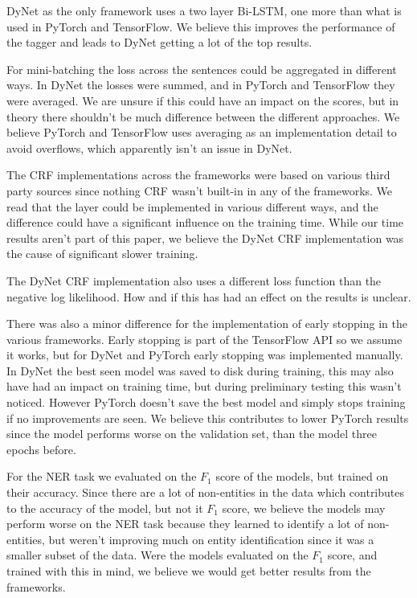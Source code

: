 DyNet as the only framework uses a two layer Bi-LSTM, one more than what is used
in PyTorch and TensorFlow. We believe this improves the performance of the
tagger and leads to DyNet getting a lot of the top results. 

For mini-batching the loss across the sentences could be aggregated in different
ways. In DyNet the losses were summed, and in PyTorch and TensorFlow they were
averaged. We are unsure if this could have an impact on the scores, but in
theory there shouldn't be much difference between the different approaches. We
believe PyTorch and TensorFlow uses averaging as an implementation detail to
avoid overflows, which apparently isn't an issue in DyNet.

The CRF implementations across the frameworks were based on various third party
sources since nothing CRF wasn't built-in in any of the frameworks. We read that
the layer could be implemented in various different ways, and the difference
could have a significant influence on the training time. While our time results
aren't part of this paper, we believe the DyNet CRF implementation was the cause
of significant slower training. 

The DyNet CRF implementation also uses a different loss function than the
negative log likelihood. How and if this has had an effect on the results is
unclear.

There was also a minor difference for the implementation of early stopping in
the various frameworks. Early stopping is part of the TensorFlow API so we
assume it works, but for DyNet and PyTorch early stopping was implemented
manually. In DyNet the best seen model was saved to disk during training, this
may also have had an impact on training time, but during preliminary testing
this wasn't noticed. However PyTorch doesn't save the best model and simply
stops training if no improvements are seen. We believe this contributes to lower
PyTorch results since the model performs worse on the validation set, than the
model three epochs before. 

For the NER task we evaluated on the $F_1$ score of the models, but trained on
their accuracy. Since there are a lot of non-entities in the data which
contributes to the accuracy of the model, but not it $F_1$ score, we believe the
models may perform worse on the NER task because they learned to identify a lot
of non-entities, but weren't improving much on entity identification since it
was a smaller subset of the data. Were the models evaluated on the $F_1$ score,
and trained with this in mind, we believe we would get better results from the
frameworks. 

